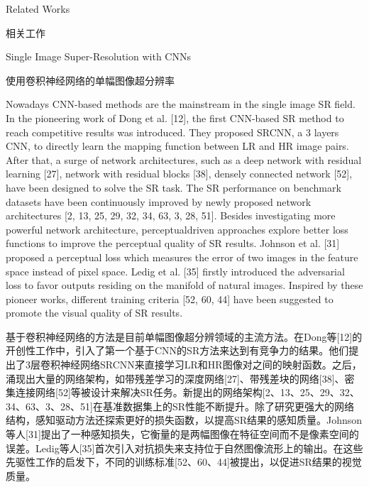 Related Works

相关工作

Single Image Super-Resolution with CNNs

使用卷积神经网络的单幅图像超分辨率

Nowadays CNN-based methods are the mainstream in the single image SR field. In the pioneering work of Dong et al. [12], the first CNN-based SR method to reach competitive results was introduced. They proposed SRCNN, a 3 layers CNN, to directly learn the mapping function between LR and HR image pairs. After that, a surge of network architectures, such as a deep network with residual learning [27], network with residual blocks [38], densely connected network [52], have been designed to solve the SR task. The SR performance on benchmark datasets have been continuously improved by newly proposed network architectures [2, 13, 25, 29, 32, 34, 63, 3, 28, 51]. Besides investigating more powerful network architecture, perceptualdriven approaches explore better loss functions to improve the perceptual quality of SR results. Johnson et al. [31] proposed a perceptual loss which measures the error of two images in the feature space instead of pixel space. Ledig et al. [35] firstly introduced the adversarial loss to favor outputs residing on the manifold of natural images. Inspired by these pioneer works, different training criteria [52, 60, 44] have been suggested to promote the visual quality of SR results.

基于卷积神经网络的方法是目前单幅图像超分辨领域的主流方法。在Dong等[12]的开创性工作中，引入了第一个基于CNN的SR方法来达到有竞争力的结果。他们提出了3层卷积神经网络SRCNN来直接学习LR和HR图像对之间的映射函数。之后，涌现出大量的网络架构，如带残差学习的深度网络[27]、带残差块的网络[38]、密集连接网络[52]等被设计来解决SR任务。新提出的网络架构[2、13、25、29、32、34、63、3、28、51]在基准数据集上的SR性能不断提升。除了研究更强大的网络结构，感知驱动方法还探索更好的损失函数，以提高SR结果的感知质量。Johnson等人[31]提出了一种感知损失，它衡量的是两幅图像在特征空间而不是像素空间的误差。Ledig等人[35]首次引入对抗损失来支持位于自然图像流形上的输出。在这些先驱性工作的启发下，不同的训练标准[52、60、44]被提出，以促进SR结果的视觉质量。

